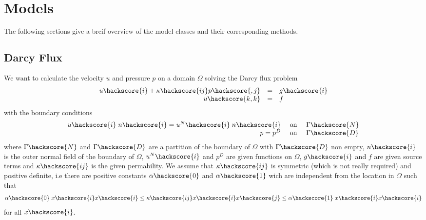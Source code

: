 
%
%
%


\chapter{Models}
\label{MODELS CHAPTER}

The following sections give a breif overview of the model classes and their corresponding methods.

 


\section{Darcy Flux}
We want to calculate the velocity $u$ and pressure $p$ on a domain $\Omega$ solving 
the Darcy flux problem 
\begin{equation}\label{DARCY PROBLEM}
\begin{array}{rcl}
u\hackscore{i} + \kappa\hackscore{ij} p\hackscore{,j} & = & g\hackscore{i} \\
u\hackscore{k,k} & = & f
\end{array}
\end{equation} 
with the boundary conditions
\begin{equation}\label{DARCY BOUNDARY}
\begin{array}{rcl}
u\hackscore{i} \; n\hackscore{i}  = u^{N}\hackscore{i}  \; n\hackscore{i} & \mbox{ on } & \Gamma\hackscore{N} \\
p = p^{D} &  \mbox{ on } & \Gamma\hackscore{D} \\ 
\end{array}
\end{equation} 
where $\Gamma\hackscore{N}$ and $\Gamma\hackscore{D}$ are a partition of the boundary of $\Omega$ with $\Gamma\hackscore{D}$ non empty, $n\hackscore{i}$ is the outer normal field of the boundary of $\Omega$, $u^{N}\hackscore{i}$ and $p^{D}$ are given functions on $\Omega$, $g\hackscore{i}$ and $f$ are given source terms and $\kappa\hackscore{ij}$ is the given permability. We assume that $\kappa\hackscore{ij}$ is symmetric (which is not really required) and positive definite, i.e there are positive constants $\alpha\hackscore{0}$ and $\alpha\hackscore{1}$ wich are independent from the location in $\Omega$ such that
\begin{equation}
\alpha\hackscore{0} \; x\hackscore{i} x\hackscore{i} \le \kappa\hackscore{ij} x\hackscore{i} x\hackscore{j} \le \alpha\hackscore{1} \; x\hackscore{i} x\hackscore{i}
\end{equation}
for all $x\hackscore{i}$. 


